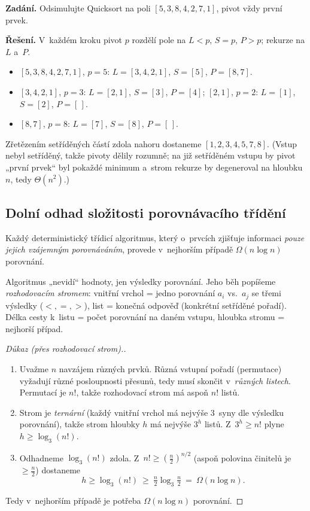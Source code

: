\documentclass[11pt,a4paper]{article}
\begin{document}
\begin{priklad}
\textbf{Zadání.} Odsimulujte Quicksort na poli $[5,3,8,4,2,7,1]$, pivot vždy první prvek.\par
\textbf{Řešení.} V~každém kroku pivot $p$ rozdělí pole na $L<p$, $S=p$, $P>p$; rekurze na $L$ a~$P$.
\begin{itemize}
  \item $[5,3,8,4,2,7,1]$, $p=5$: $L=[3,4,2,1]$, $S=[5]$, $P=[8,7]$.
  \item $[3,4,2,1]$, $p=3$: $L=[2,1]$, $S=[3]$, $P=[4]$; \quad $[2,1]$, $p=2$: $L=[1]$, $S=[2]$, $P=[\,]$.
  \item $[8,7]$, $p=8$: $L=[7]$, $S=[8]$, $P=[\,]$.
\end{itemize}
Zřetězením setříděných částí zdola nahoru dostaneme $\boxed{[1,2,3,4,5,7,8]}$. (Vstup nebyl setříděný, takže pivoty dělily rozumně; na již setříděném vstupu by pivot „první prvek`` byl pokaždé minimum a~strom rekurze by degeneroval na hloubku $n$, tedy $\Theta(n^2)$.)
\end{priklad}

\subsection{Dolní odhad složitosti porovnávacího třídění}

\begin{veta}
Každý deterministický třídicí algoritmus, který o~prvcích zjišťuje informaci \emph{pouze jejich vzájemným porovnáváním}, provede v~nejhorším případě $\Omega(n\log n)$ porovnání.
\end{veta}

\begin{intuice}
Algoritmus „nevidí`` hodnoty, jen výsledky porovnání. Jeho běh popíšeme \emph{rozhodovacím stromem}: vnitřní vrchol = jedno porovnání $a_i$ vs.\ $a_j$ se třemi výsledky ($<,=,>$), list = konečná odpověď (konkrétní setříděné pořadí). Délka cesty k~listu = počet porovnání na daném vstupu, hloubka stromu = nejhorší případ.
\end{intuice}

\begin{proof}[Důkaz (přes rozhodovací strom).]
\begin{enumerate}[label=(\arabic*)]
  \item Uvažme $n$ navzájem různých prvků. Různá vstupní pořadí (permutace) vyžadují různé posloupnosti přesunů, tedy musí skončit v~\emph{různých listech}. Permutací je $n!$, takže rozhodovací strom má aspoň $n!$ listů.
  \item Strom je \emph{ternární} (každý vnitřní vrchol má nejvýše 3~syny dle výsledku porovnání), takže strom hloubky $h$ má nejvýše $3^h$ listů. Z~$3^h\ge n!$ plyne $h\ge\log_3(n!)$.
  \item Odhadneme $\log_3(n!)$ zdola. Z~$n!\ge\left(\tfrac n2\right)^{n/2}$ (aspoň polovina činitelů je $\ge\tfrac n2$) dostaneme
  \[
  h\ge\log_3(n!)\ \ge\ \tfrac n2\log_3\tfrac n2\ =\ \Omega(n\log n).
  \]
\end{enumerate}
Tedy v~nejhorším případě je potřeba $\Omega(n\log n)$ porovnání.
\end{proof}
\end{document}
